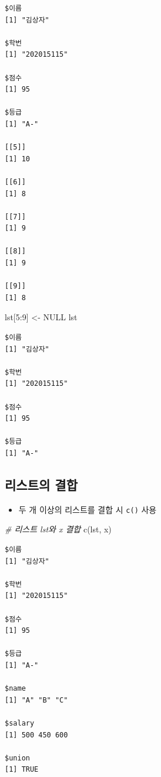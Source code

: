 \documentclass[
  11pt,
]{krantz}
\newenvironment{Shaded}{\begin{snugshade}}{\end{snugshade}}
\newcommand{\CommentTok}[1]{\textcolor[rgb]{0.37,0.37,0.37}{\textit{#1}}}
\newcommand{\ConstantTok}[1]{\textcolor[rgb]{0,0,0}{#1}}
\newcommand{\DecValTok}[1]{\textcolor[rgb]{0.06,0.06,0.06}{#1}}
\newcommand{\FunctionTok}[1]{\textcolor[rgb]{0,0,0}{#1}}
\newcommand{\NormalTok}[1]{#1}
\newcommand{\OtherTok}[1]{\textcolor[rgb]{0.37,0.37,0.37}{#1}}
\newcommand{\SpecialCharTok}[1]{\textcolor[rgb]{0,0,0}{#1}}
\providecommand{\tightlist}{%
  \setlength{\itemsep}{0pt}\setlength{\parskip}{0pt}}
\begin{document}
\begin{verbatim}
$이름
[1] "김상자"

$학번
[1] "202015115"

$점수
[1] 95

$등급
[1] "A-"

[[5]]
[1] 10

[[6]]
[1] 8

[[7]]
[1] 9

[[8]]
[1] 9

[[9]]
[1] 8
\end{verbatim}

\begin{Shaded}
\begin{Highlighting}[]
\NormalTok{lst[}\DecValTok{5}\SpecialCharTok{:}\DecValTok{9}\NormalTok{] }\OtherTok{\textless{}{-}}  \ConstantTok{NULL}
\NormalTok{lst}
\end{Highlighting}
\end{Shaded}

\begin{verbatim}
$이름
[1] "김상자"

$학번
[1] "202015115"

$점수
[1] 95

$등급
[1] "A-"
\end{verbatim}

\normalsize

\hypertarget{list-combine}{%
\subsection{리스트의 결합}\label{list-combine}}

\begin{itemize}
\tightlist
\item
  두 개 이상의 리스트를 결합 시 \texttt{c()} 사용
\end{itemize}

\footnotesize

\begin{Shaded}
\begin{Highlighting}[]
\CommentTok{\# 리스트 lst와 x 결합}
\FunctionTok{c}\NormalTok{(lst, x)}
\end{Highlighting}
\end{Shaded}

\begin{verbatim}
$이름
[1] "김상자"

$학번
[1] "202015115"

$점수
[1] 95

$등급
[1] "A-"

$name
[1] "A" "B" "C"

$salary
[1] 500 450 600

$union
[1] TRUE
\end{verbatim}
\end{document}
